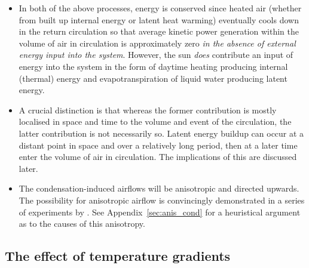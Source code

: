 \begin{itemize}
\begin{itemize}
		\item In both of the above processes, energy is conserved since heated air (whether from built up internal energy or latent heat warming) eventually cools down in the return circulation so that average kinetic power generation within the volume of air in circulation is approximately zero \textit{in the absence of external energy input into the system}. However, the sun \textit{does} contribute an input of energy into the system in the form of daytime heating producing internal (thermal) energy and evapotranspiration of liquid water producing latent energy.
		\item A crucial distinction is that whereas the former contribution is mostly localised in space and time to the volume and event of the circulation, the latter contribution is not necessarily so. Latent energy buildup can occur at a distant point in space and over a relatively long period, then at a later time enter the volume of air in circulation. The implications of this are discussed later.
		\item The condensation-induced airflows will be anisotropic and directed upwards. The possibility for anisotropic airflow is convincingly demonstrated in a series of experiments by \citet{bunyard2015, bunyard2017, bunyard2019}. See Appendix~\ref{sec:anis_cond} for a heuristical argument as to the causes of this anisotropy.
	\end{itemize}
\end{itemize}

\subsection{The effect of temperature gradients}

